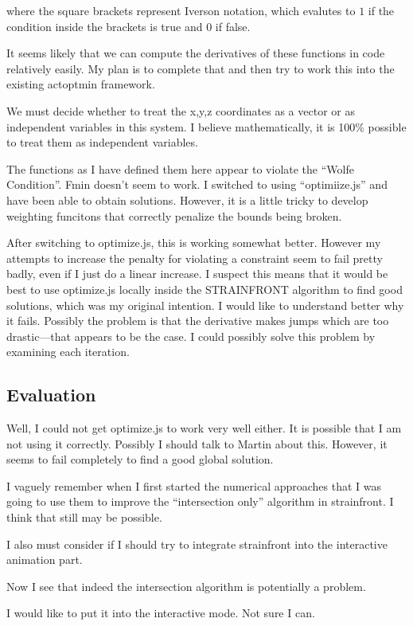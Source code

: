\documentclass[11pt]{article}
\begin{document}
where the square brackets represent Iverson notation, which evalutes to $1$ if the condition
inside the brackets is true and $0$ if false.

It seems likely that we can compute the derivatives of these functions in code relatively easily.
My plan is to complete that and then try to work this into the existing actoptmin framework.

We must decide whether to treat the x,y,z coordinates as a vector or as independent variables in
this system. I believe mathematically, it is 100\% possible to treat them as independent variables.

The functions as I have defined them here appear to violate the ``Wolfe Condition''. Fmin doesn't seem to work.
I switched to using ``optimiize.js'' and have been able to obtain solutions.  However, it is a little
tricky to develop weighting funcitons that correctly penalize the bounds being broken.

After switching to optimize.js, this is working somewhat better. However my attempts to increase
the penalty for violating a constraint seem to fail pretty badly, even if I just do a linear increase.
I suspect this means that it would be best to use optimize.js locally inside the STRAINFRONT algorithm
to find good solutions, which was my original intention. I would like to understand better why it fails.
Possibly the problem is that the derivative makes jumps which are too drastic---that appears to be
the case. I could possibly solve this problem by examining each iteration.

\subsection{Evaluation}

Well, I could not get optimize.js to work very well either.  It is possible that I am not using it correctly.
Possibly I should talk to Martin about this.  However, it seems to fail completely to find a good global
solution.

I vaguely remember when I first started the numerical approaches that I was going to use them to improve the
``intersection only'' algorithm in strainfront.  I think that still may be possible.

I also must consider if I should try to integrate strainfront into the interactive animation part.

Now I see that indeed the intersection algorithm is potentially a problem.

I would like to put it into the interactive mode.  Not sure I can.
\end{document}

